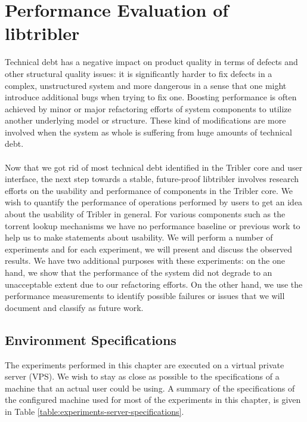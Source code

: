 \chapter{Performance Evaluation of libtribler}
\label{chapter:experiments}

Technical debt has a negative impact on product quality in terms of defects and other structural quality issues\cite{tom2013exploration}: it is significantly harder to fix defects in a complex, unstructured system and more dangerous in a sense that one might introduce additional bugs when trying to fix one. Boosting performance is often achieved by minor or major refactoring efforts of system components to utilize another underlying model or structure. These kind of modifications are more involved when the system as whole is suffering from huge amounts of technical debt.\\\\
Now that we got rid of most technical debt identified in the Tribler core and user interface, the next step towards a stable, future-proof libtribler involves research efforts on the usability and performance of components in the Tribler core. We wish to quantify the performance of operations performed by users to get an idea about the usability of Tribler in general. For various components such as the torrent lookup mechanisms we have no performance baseline or previous work to help us to make statements about usability. We will perform a number of experiments and for each experiment, we will present and discuss the observed results. We have two additional purposes with these experiments: on the one hand, we show that the performance of the system did not degrade to an unacceptable extent due to our refactoring efforts. On the other hand, we use the performance measurements to identify possible failures or issues that we will document and classify as future work.

\section{Environment Specifications}
\label{sec:environment-specifications}
The experiments performed in this chapter are executed on a virtual private server (VPS). We wish to stay as close as possible to the specifications of a machine that an actual user could be using. A summary of the specifications of the configured machine used for most of the experiments in this chapter, is given in Table \ref{table:experiments-server-specifications}.

